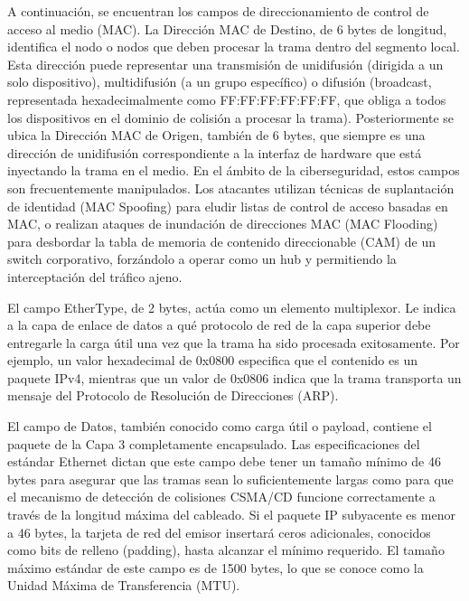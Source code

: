 \documentclass[a4paper,12pt]{article}
\begin{document}
A continuación, se encuentran los campos de direccionamiento de control de acceso al medio (MAC). La Dirección MAC de Destino, de 6 bytes de longitud, identifica el nodo o nodos que deben procesar la trama dentro del segmento local. Esta dirección puede representar una transmisión de unidifusión (dirigida a un solo dispositivo), multidifusión (a un grupo específico) o difusión (broadcast, representada hexadecimalmente como FF:FF:FF:FF:FF:FF, que obliga a todos los dispositivos en el dominio de colisión a procesar la trama). Posteriormente se ubica la Dirección MAC de Origen, también de 6 bytes, que siempre es una dirección de unidifusión correspondiente a la interfaz de hardware que está inyectando la trama en el medio. En el ámbito de la ciberseguridad, estos campos son frecuentemente manipulados. Los atacantes utilizan técnicas de suplantación de identidad (MAC Spoofing) para eludir listas de control de acceso basadas en MAC, o realizan ataques de inundación de direcciones MAC (MAC Flooding) para desbordar la tabla de memoria de contenido direccionable (CAM) de un switch corporativo, forzándolo a operar como un hub y permitiendo la interceptación del tráfico ajeno.

El campo EtherType, de 2 bytes, actúa como un elemento multiplexor. Le indica a la capa de enlace de datos a qué protocolo de red de la capa superior debe entregarle la carga útil una vez que la trama ha sido procesada exitosamente. Por ejemplo, un valor hexadecimal de 0x0800 especifica que el contenido es un paquete IPv4, mientras que un valor de 0x0806 indica que la trama transporta un mensaje del Protocolo de Resolución de Direcciones (ARP). 

El campo de Datos, también conocido como carga útil o payload, contiene el paquete de la Capa 3 completamente encapsulado. Las especificaciones del estándar Ethernet dictan que este campo debe tener un tamaño mínimo de 46 bytes para asegurar que las tramas sean lo suficientemente largas como para que el mecanismo de detección de colisiones CSMA/CD funcione correctamente a través de la longitud máxima del cableado. Si el paquete IP subyacente es menor a 46 bytes, la tarjeta de red del emisor insertará ceros adicionales, conocidos como bits de relleno (padding), hasta alcanzar el mínimo requerido. El tamaño máximo estándar de este campo es de 1500 bytes, lo que se conoce como la Unidad Máxima de Transferencia (MTU).
\end{document}
